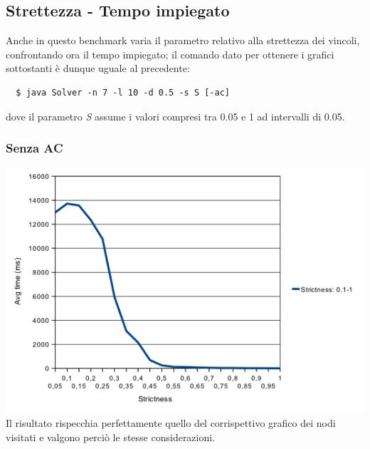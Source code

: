\documentclass[a4paper,12pt,italian]{article}
\begin{document}
\subsection{Strettezza - Tempo impiegato}
Anche in questo benchmark varia il parametro relativo alla strettezza dei vincoli, confrontando
ora il tempo impiegato; il comando dato per ottenere i grafici sottostanti
\`e dunque uguale al precedente:
\begin{verbatim}
  $ java Solver -n 7 -l 10 -d 0.5 -s S [-ac]
\end{verbatim}
dove il parametro \textit{S} assume i valori compresi tra 0.05 e 1 ad intervalli di 0.05.

\subsubsection{Senza AC}
\includegraphics[scale=0.8]{strictTime.png}
\\
Il risultato rispecchia perfettamente quello del corrispettivo grafico dei nodi visitati e
valgono perci\`o le stesse considerazioni.
\end{document}
